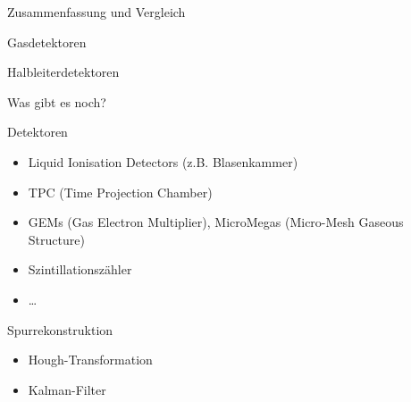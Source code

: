 

\begin{frame}{Zusammenfassung und Vergleich}
	
	\begin{block}{Gasdetektoren}
	\end{block}
	
	\begin{block}{Halbleiterdetektoren}
	
	\end{block}

\end{frame}


\begin{frame}{Was gibt es noch?}
	
	\begin{block}{Detektoren}
		\begin{itemize}
		  \item Liquid Ionisation Detectors (z.B. Blasenkammer)
		  \item TPC (Time Projection Chamber)
		  \item GEMs (Gas Electron Multiplier), MicroMegas (Micro-Mesh Gaseous Structure)
		  \item Szintillationszähler
		  \item \ldots
		\end{itemize}
	\end{block}
	
		\begin{block}{Spurrekonstruktion}
		\begin{itemize}
		  \item Hough-Transformation
		  \item Kalman-Filter
		\end{itemize}
	\end{block}

\end{frame}